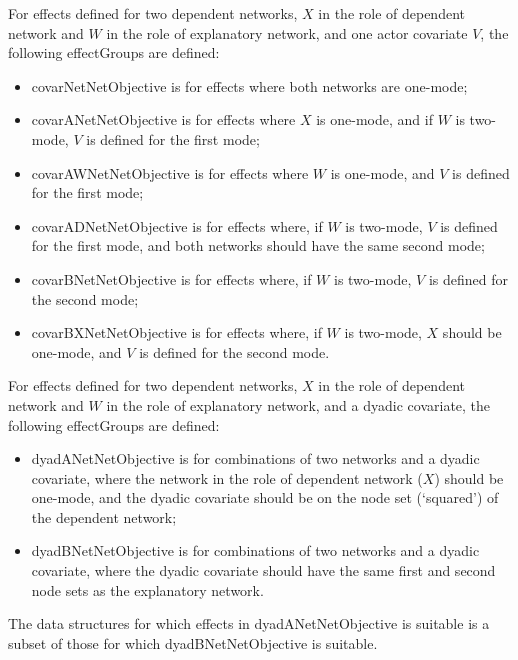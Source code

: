 \documentclass[a4paper,fleqn,11pt]{article}
\newcommand{\+}{\, + \,}
\newcommand{\sfn}[1]{\textsf{#1}}
\begin{document}
For effects defined for two dependent networks,
$X$ in the role of dependent network and $W$ in the role
of explanatory network, and one actor covariate $V$,
the following effectGroups are defined:
\begin{itemize}
\item \sfn{covarNetNetObjective} is for effects where
        both networks are one-mode;
\item \sfn{covarANetNetObjective} is for effects where
        $X$ is one-mode, and if $W$ is two-mode,
        $V$ is defined for the first mode;
\item \sfn{covarAWNetNetObjective} is for effects where
        $W$ is one-mode, and $V$ is defined for the first mode;
\item \sfn{covarADNetNetObjective} is for effects where,
        if $W$ is two-mode, $V$ is defined for the first mode,
        and both networks should have the same second mode;
\item \sfn{covarBNetNetObjective} is for effects where,
        if $W$ is two-mode,
         $V$ is defined for the second mode;
\item \sfn{covarBXNetNetObjective} is for effects where,
        if $W$ is two-mode,
        $X$ should be one-mode, and $V$ is defined for the second mode.
\end{itemize}
\medskip

For effects defined for two dependent networks,
$X$ in the role of dependent network and $W$ in the role
of explanatory network, and a dyadic covariate,
the following effectGroups are defined:

\begin{itemize}
\item \sfn{dyadANetNetObjective} is for combinations
    of two networks and a dyadic covariate, where the network in the role
    of dependent network ($X$) should be one-mode, and the dyadic covariate
    should be on the node set (`squared') of the dependent network;
\item \sfn{dyadBNetNetObjective} is for combinations
    of two networks and a dyadic covariate, where the dyadic covariate
    should have the same first and second node sets
    as the explanatory network.
\end{itemize}
The data structures for which effects in \sfn{dyadANetNetObjective}
is suitable is a subset of those for which \sfn{dyadBNetNetObjective}
is suitable.
\end{document}
